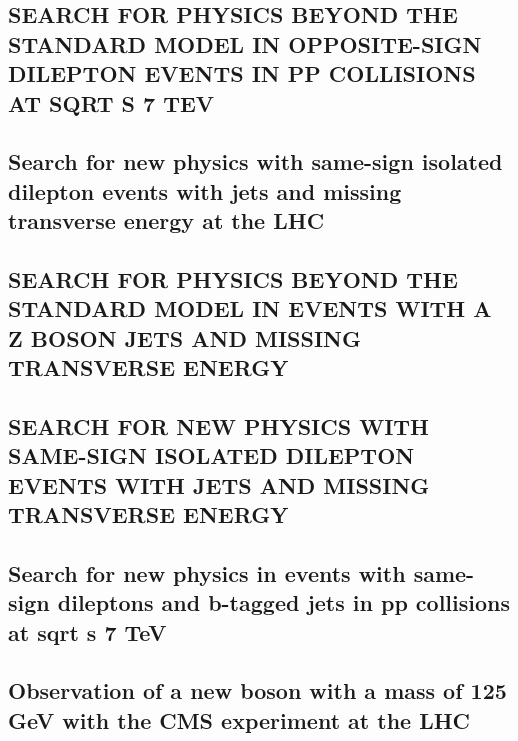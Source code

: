 \documentclass[a4paper, 11pt, twoside, openright]{report}
\begin{document}
\subsection{SEARCH FOR PHYSICS BEYOND THE STANDARD MODEL IN OPPOSITE-SIGN DILEPTON EVENTS IN PP COLLISIONS AT SQRT S 7 TEV}


\subsection{Search for new physics with same-sign isolated dilepton events with jets and missing transverse energy at the LHC}


\subsection{SEARCH FOR PHYSICS BEYOND THE STANDARD MODEL IN EVENTS WITH A Z BOSON JETS AND MISSING TRANSVERSE ENERGY}


\subsection{SEARCH FOR NEW PHYSICS WITH SAME-SIGN ISOLATED DILEPTON EVENTS WITH JETS AND MISSING TRANSVERSE ENERGY}


\subsection{Search for new physics in events with same-sign dileptons and b-tagged jets in pp collisions at sqrt s 7 TeV}


\subsection{Observation of a new boson with a mass of 125 GeV with the CMS experiment at the LHC }

\end{document}

